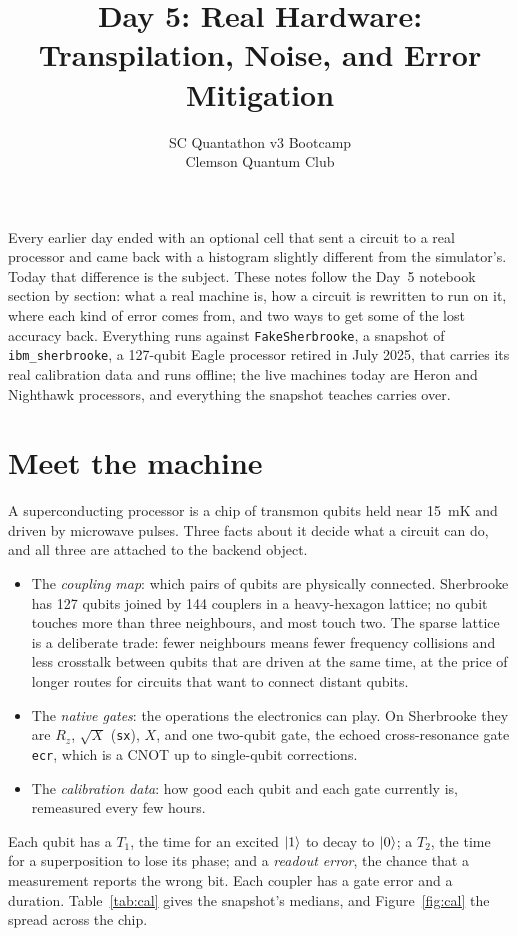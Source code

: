 \documentclass[11pt]{article}
\title{Day 5: Real Hardware: Transpilation, Noise, and Error Mitigation}
\author{SC Quantathon v3 Bootcamp \\ Clemson Quantum Club}
\date{}
\newcommand{\code}[1]{\texttt{#1}}
\begin{document}
\maketitle

\noindent
Every earlier day ended with an optional cell that sent a circuit to a real processor and came back with a histogram slightly different from the simulator's. Today that difference is the subject. These notes follow the Day~5 notebook section by section: what a real machine is, how a circuit is rewritten to run on it, where each kind of error comes from, and two ways to get some of the lost accuracy back. Everything runs against \code{FakeSherbrooke}, a snapshot of \code{ibm\_sherbrooke}, a 127-qubit Eagle processor retired in July 2025, that carries its real calibration data and runs offline; the live machines today are Heron and Nighthawk processors, and everything the snapshot teaches carries over.

\section{Meet the machine}

A superconducting processor is a chip of transmon qubits held near 15~mK and driven by microwave pulses. Three facts about it decide what a circuit can do, and all three are attached to the backend object.

\begin{itemize}
\item The \emph{coupling map}: which pairs of qubits are physically connected. Sherbrooke has 127 qubits joined by 144 couplers in a heavy-hexagon lattice; no qubit touches more than three neighbours, and most touch two. The sparse lattice is a deliberate trade: fewer neighbours means fewer frequency collisions and less crosstalk between qubits that are driven at the same time, at the price of longer routes for circuits that want to connect distant qubits.
\item The \emph{native gates}: the operations the electronics can play. On Sherbrooke they are $R_z$, $\sqrt X$ (\code{sx}), $X$, and one two-qubit gate, the echoed cross-resonance gate \code{ecr}, which is a CNOT up to single-qubit corrections.
\item The \emph{calibration data}: how good each qubit and each gate currently is, remeasured every few hours.
\end{itemize}

Each qubit has a $T_1$, the time for an excited $\ket{1}$ to decay to $\ket{0}$; a $T_2$, the time for a superposition to lose its phase; and a \emph{readout error}, the chance that a measurement reports the wrong bit. Each coupler has a gate error and a duration. Table~\ref{tab:cal} gives the snapshot's medians, and Figure~\ref{fig:cal} the spread across the chip.
\end{document}
